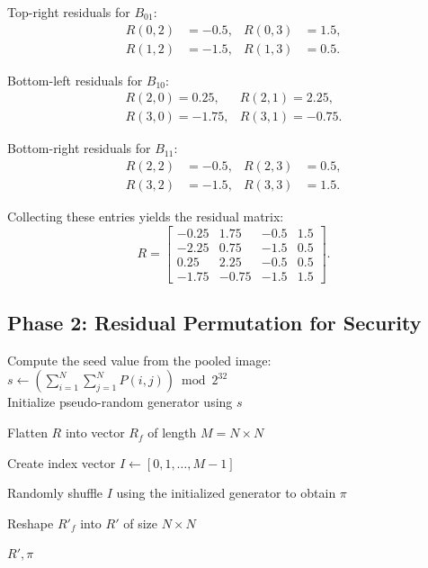 Top-right residuals for \(B_{01}\):
\begin{equation}
\begin{aligned}
R(0,2) &= -0.5, & R(0,3) &= 1.5, \\
R(1,2) &= -1.5, & R(1,3) &= 0.5.
\end{aligned}
\end{equation}

Bottom-left residuals for \(B_{10}\):
\begin{equation}
\begin{array}{cc}
R(2,0)=0.25, & R(2,1)=2.25,\\[4pt]
R(3,0)=-1.75, & R(3,1)=-0.75.
\end{array}
\end{equation}

Bottom-right residuals for \(B_{11}\):
\begin{equation}
\begin{aligned}
R(2,2) &= -0.5, & R(2,3) &= 0.5, \\
R(3,2) &= -1.5, & R(3,3) &= 1.5.
\end{aligned}
\end{equation}

Collecting these entries yields the residual matrix:
\begin{equation}
R =
\begin{bmatrix}
-0.25 & 1.75  & -0.5 & 1.5 \\
-2.25 & 0.75  & -1.5 & 0.5 \\
0.25  & 2.25  & -0.5 & 0.5 \\
-1.75 & -0.75 & -1.5 & 1.5
\end{bmatrix}.
\end{equation}

\subsection{Phase 2: Residual Permutation for Security}

\begin{algorithm}[H]
\caption{Permutation of Residual Matrix}
\label{alg:residual_permutation}
\LinesNumbered
\setcounter{AlgoLine}{0}


Compute the seed value from the pooled image: \\
$s \gets \left( \sum_{i=1}^{N} \sum_{j=1}^{N} P(i,j) \right) \bmod 2^{32}$ \\

Initialize pseudo-random generator using $s$\;

Flatten $R$ into vector $R_f$ of length $M = N \times N$\;

Create index vector $I \gets [0, 1, \dots, M-1]$\;

Randomly shuffle $I$ using the initialized generator to obtain $\pi$\;


Reshape $R'_f$ into $R'$ of size $N \times N$\;

\Return $R', \pi$\;
\end{algorithm}

